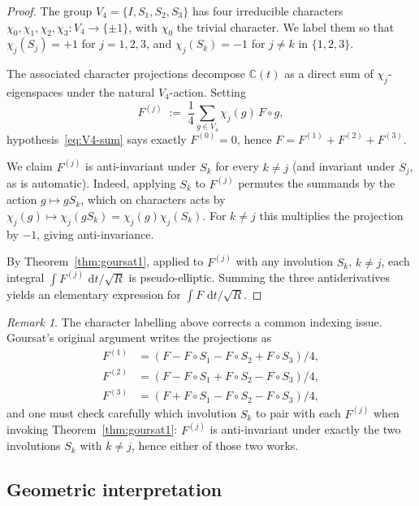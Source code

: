 \documentclass[11pt,a4paper]{article}
\theoremstyle{plain}
\theoremstyle{definition}
\theoremstyle{remark}
\newtheorem{remark}[theorem]{Remark}
\newcommand{\C}{\mathbb{C}}
\renewcommand{\d}{\,\mathrm{d}}
\begin{document}
\begin{proof}
The group $V_4=\{I,S_1,S_2,S_3\}$ has four irreducible characters $\chi_0,\chi_1,\chi_2,\chi_3 \colon V_4\to\{\pm 1\}$, with $\chi_0$ the trivial character. We label them so that $\chi_j(S_j) = +1$ for $j=1,2,3$, and $\chi_j(S_k) = -1$ for $j\neq k$ in $\{1,2,3\}$.

The associated character projections decompose $\C(t)$ as a direct sum of $\chi_j$-eigenspaces under the natural $V_4$-action. Setting
\[
  F^{(j)} \;:=\; \frac{1}{4}\sum_{g\in V_4} \chi_j(g)\,F\circ g,
\]
hypothesis~\eqref{eq:V4-sum} says exactly $F^{(0)} = 0$, hence $F = F^{(1)} + F^{(2)} + F^{(3)}$.

We claim $F^{(j)}$ is anti-invariant under $S_k$ for every $k\neq j$ (and invariant under $S_j$, as is automatic). Indeed, applying $S_k$ to $F^{(j)}$ permutes the summands by the action $g\mapsto gS_k$, which on characters acts by $\chi_j(g)\mapsto \chi_j(gS_k) = \chi_j(g)\chi_j(S_k)$. For $k\neq j$ this multiplies the projection by $-1$, giving anti-invariance.

By Theorem~\ref{thm:goursat1}, applied to $F^{(j)}$ with any involution $S_k$, $k\neq j$, each integral $\int F^{(j)}\,\d t/\sqrt{R}$ is pseudo-elliptic. Summing the three antiderivatives yields an elementary expression for $\int F\,\d t/\sqrt{R}$.
\end{proof}

\begin{remark}
The character labelling above corrects a common indexing issue. Goursat's original argument writes the projections as
\begin{align*}
  F^{(1)} &= (F - F\!\circ\! S_1 - F\!\circ\! S_2 + F\!\circ\! S_3)/4, \\
  F^{(2)} &= (F - F\!\circ\! S_1 + F\!\circ\! S_2 - F\!\circ\! S_3)/4, \\
  F^{(3)} &= (F + F\!\circ\! S_1 - F\!\circ\! S_2 - F\!\circ\! S_3)/4,
\end{align*}
and one must check carefully which involution $S_k$ to pair with each $F^{(j)}$ when invoking Theorem~\ref{thm:goursat1}: $F^{(j)}$ is anti-invariant under exactly the two involutions $S_k$ with $k\neq j$, hence either of those two works.
\end{remark}

\subsection{Geometric interpretation}
\end{document}
